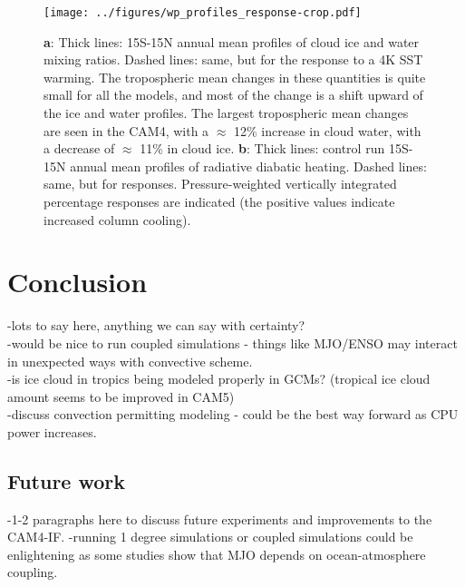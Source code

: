 \documentclass[letterpaper,12pt,titlepage,oneside,final]{book}
\let\origdoublepage\cleardoublepage
\newcommand{\clearemptydoublepage}{%
  \clearpage{\pagestyle{empty}\origdoublepage}}
\let\cleardoublepage\clearemptydoublepage
\begin{document}
\begin{figure}[H]
\centering
\noindent\texttt{[image: ../figures/wp\_profiles\_response-crop.pdf]}\hfill
\caption{\textbf{a}: Thick lines: 15S-15N annual mean profiles of cloud ice and water mixing ratios. Dashed lines: same, but for the response to a 4K SST warming. The tropospheric mean changes in these quantities is quite small for all the models, and most of the change is a shift upward of the ice and water profiles. The largest tropospheric mean changes are seen in the CAM4, with a $\approx$ 12\% increase in cloud water, with a decrease of $\approx$ 11\% in cloud ice. \textbf{b}: Thick lines: control run 15S-15N annual mean profiles of radiative diabatic heating. Dashed lines: same, but for responses. Pressure-weighted vertically integrated percentage responses are indicated (the positive values indicate increased column cooling).}
\end{figure}

\chapter{Conclusion}
-lots to say here, anything we can say with certainty?
\\
-would be nice to run coupled simulations - things like MJO/ENSO may interact in unexpected ways with convective scheme.
\\
-is ice cloud in tropics being modeled properly in GCMs? (tropical ice cloud amount seems to be improved in CAM5)
\\
-discuss convection permitting modeling - could be the best way forward as CPU power increases.
\\
\section{Future work}
-1-2 paragraphs here to discuss future experiments and improvements to the CAM4-IF.
-running 1 degree simulations or coupled simulations could be enlightening as some studies show that MJO depends on ocean-atmosphere coupling.




\cleardoublepage %
\renewcommand*{\bibname}{References}
\end{document}

